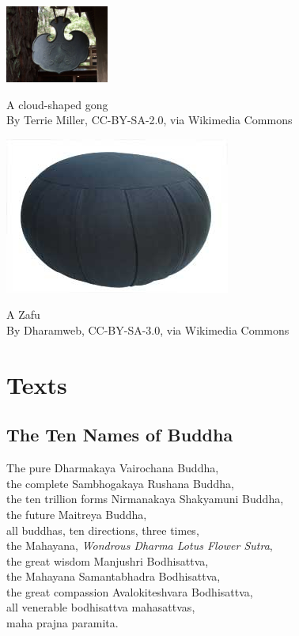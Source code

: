 \documentclass{article}
\begin{document}
\begin{multicols}{2}
\begin{center}
\includegraphics[height=1in]{Images/Green_Gulch_Farm_Dinner_Gong.jpg}

{\small A cloud-shaped gong\\
\scriptsize By Terrie Miller, CC-BY-SA-2.0, via Wikimedia Commons\par}

\vfill

\includegraphics[height=.75in]{Images/Zafu.jpg}

{\small A Zafu\\
\scriptsize By Dharamweb, CC-BY-SA-3.0, via Wikimedia Commons\par}

\end{center}

\columnbreak

\section{Texts}

\subsection{The Ten Names of Buddha}

The pure Dharmakaya Vairochana Buddha,\\
the complete Sambhogakaya Rushana Buddha,\\
the ten trillion forms Nirmanakaya Shakyamuni Buddha,\\
the future Maitreya Buddha,\\
all buddhas, ten directions, three times,\\
the Mahayana, \emph{Wondrous Dharma Lotus Flower Sutra},\\
the great wisdom Manjushri Bodhisattva,\\
the Mahayana Samantabhadra Bodhisattva,\\
the great compassion Avalokiteshvara Bodhisattva,\\
all venerable bodhisattva mahasattvas,\\
maha prajna paramita.


\end{multicols}
\end{document}
